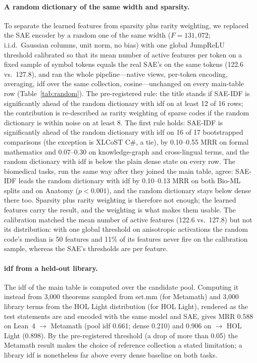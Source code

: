 \documentclass[11pt]{article}
\newcommand{\method}{SAE\mbox{-}IDF\xspace}
\begin{document}
\paragraph{A random dictionary of the same width and sparsity.}
To separate the learned features from sparsity plus rarity weighting, we replaced the SAE encoder by a random one of the same width ($F=131{,}072$; i.i.d.\ Gaussian columns, unit norm, no bias) with one global JumpReLU threshold calibrated so that its mean number of active features per token on a fixed sample of symbol tokens equals the real SAE's on the same tokens (122.6 vs.\ 127.8), and ran the whole pipeline---native views, per-token encoding, averaging, idf over the same collection, cosine---unchanged on every main-table row (Table~\ref{tab:random}).
The pre-registered rule: the title stands if \method is significantly ahead of the random dictionary with idf on at least 12 of 16 rows; the contribution is re-described as rarity weighting of sparse codes if the random dictionary is within noise on at least 8.
The first rule holds: \method is significantly ahead of the random dictionary with idf on 16 of 17 bootstrapped comparisons (the exception is XLCoST C\#, a tie), by 0.10--0.55 MRR on formal mathematics and 0.07--0.30 on knowledge-graph and cross-lingual terms, and the random dictionary with idf is below the plain dense state on every row. The biomedical tasks, run the same way after they joined the main table, agree: \method leads the random dictionary with idf by 0.10--0.13 MRR on both Bio-ML splits and on Anatomy ($p<0.001$), and the random dictionary stays below dense there too.
Sparsity plus rarity weighting is therefore not enough; the learned features carry the result, and the weighting is what makes them usable.
The calibration matched the mean number of active features (122.6 vs.\ 127.8) but not its distribution: with one global threshold on anisotropic activations the random code's median is 50 features and 11\% of its features never fire on the calibration sample, whereas the SAE's thresholds are per feature.

\begin{table}[H]
  \centering\scriptsize
  
  \caption{A random 131k-feature dictionary with the SAE's sparsity, unweighted and with the same idf weighting, against the SAE (MRR unless stated). Bold: best per row.}
  \label{tab:random}
\end{table}

\paragraph{idf from a held-out library.}
The idf of the main table is computed over the candidate pool.
Computing it instead from 3,000 theorems sampled from set.mm (for Metamath) and 3,000 library terms from the HOL Light distribution (for HOL Light), rendered as the test statements are and encoded with the same model and SAE, gives MRR 0.588 on Lean~4 $\to$ Metamath (pool idf 0.661; dense 0.210) and 0.906 on $\to$ HOL Light (0.898).
By the pre-registered threshold (a drop of more than 0.05) the Metamath result makes the choice of reference collection a stated limitation; a library idf is nonetheless far above every dense baseline on both tasks.
\end{document}
